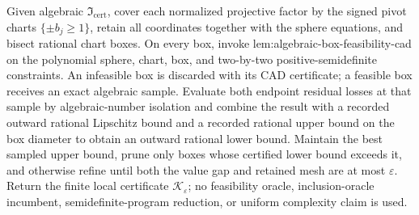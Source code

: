 Given algebraic \(\mathfrak I_{\mathrm{cert}}\), cover each normalized projective factor by the signed pivot charts \(\{\pm b_j\ge1\}\), retain all coordinates together with the sphere equations, and bisect rational chart boxes.  On every box, invoke lem:algebraic-box-feasibility-cad on the polynomial sphere, chart, box, and two-by-two positive-semidefinite constraints.  An infeasible box is discarded with its CAD certificate; a feasible box receives an exact algebraic sample.  Evaluate both endpoint residual losses at that sample by algebraic-number isolation and combine the result with a recorded outward rational Lipschitz bound and a recorded rational upper bound on the box diameter to obtain an outward rational lower bound.  Maintain the best sampled upper bound, prune only boxes whose certified lower bound exceeds it, and otherwise refine until both the value gap and retained mesh are at most \(\varepsilon\).  Return the finite local certificate \(\mathscr K_{\varepsilon}\); no feasibility oracle, inclusion-oracle incumbent, semidefinite-program reduction, or uniform complexity claim is used.